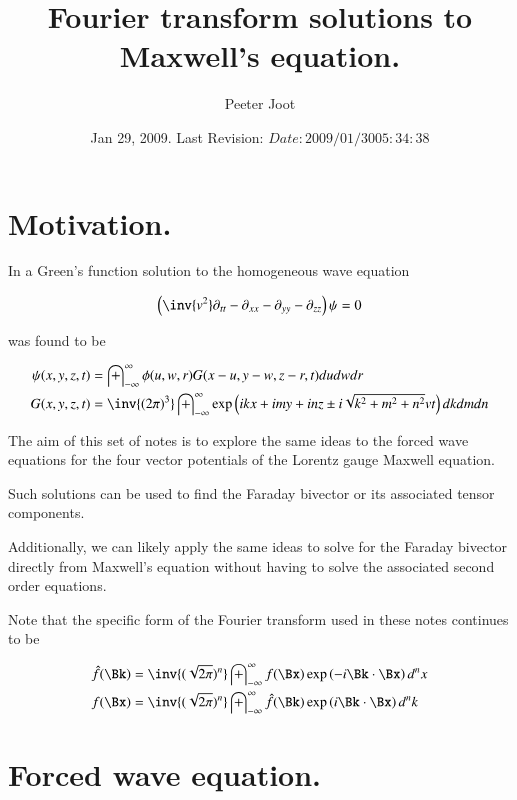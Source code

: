 \documentclass{article}
\title{ Fourier transform solutions to Maxwell's equation. }
\author{Peeter Joot}
\date{ Jan 29, 2009.  Last Revision: $Date: 2009/01/30 05:34:38 $ }
\newcommand{\IIinf}[0]{ \int_{-\infty}^\infty }
\begin{document}
\maketitle{}

\tableofcontents
\section{ Motivation. }

In \cite{PJwaveFourier} a Green's function solution to the homogeneous
wave equation

\begin{align}\label{eqn:wave}
\left(\inv{v^2} \partial_{tt} -\partial_{xx} -\partial_{yy} -\partial_{zz} \right)\psi = 0
\end{align}

was found to be

\begin{align}\label{eqn:greensSolution3d}
{\psi}(x,y,z,t) &= \IIinf \phi(u,w,r) G( x-u, y-w, z-r, t) du dw dr \\
G(x,y,z,t) &= \inv{({2\pi})^3} \IIinf \exp\left( i k x + i m y + i n z \pm i \sqrt{k^2 + m^2 + n^2} v t \right) dk dm dn
\end{align}

The aim of this set of notes is to explore the same ideas to the forced wave
equations for the four vector potentials of the Lorentz gauge Maxwell equation.

Such solutions can be used to find the Faraday bivector or its associated
tensor components.

Additionally, we can likely apply the same ideas to solve for the Faraday
bivector directly from Maxwell's equation without having to solve the
associated second order equations.

Note that the specific form of the Fourier transform used in these notes continues to be

\begin{align}
\hat{f}(\Bk) &= \inv{(\sqrt{2\pi})^n} \IIinf f(\Bx) \exp\left( -i \Bk \cdot \Bx \right) d^n x \\
{f}(\Bx) &= \inv{(\sqrt{2\pi})^n} \IIinf \hat{f}(\Bk) \exp\left( i \Bk \cdot \Bx \right) d^n k
\end{align}

\section{ Forced wave equation. }
\end{document}
